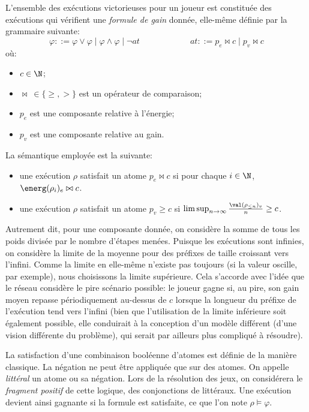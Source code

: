 L'ensemble des exécutions victorieuses pour un joueur est constituée des exécutions qui vérifient une \emph{formule de gain} donnée, elle-même définie par la grammaire suivante:
\[ \varphi ::= \varphi \vee \varphi \mid \varphi \wedge \varphi \mid \neg\mathit{at}
\hspace{6em}
\mathit{at} ::= p_e \bowtie c \mid p_v \bowtie c \]
où:
\begin{itemize}
    \item $c \in \N$;
    \item $\bowtie\ \in \{\geq,>\}$ est un opérateur de comparaison;
    \item $p_e$ est une composante relative à l'énergie;
    \item $p_v$ est une composante relative au gain.
\end{itemize}

La sémantique employée est la suivante:
\begin{itemize}
    \item une exécution $\rho$ satisfait un atome $p_e \bowtie c$ si pour chaque $i \in \N$, $\energ(\rho_i)_e \bowtie c$.
    \item une exécution $\rho$ satisfait un atome $p_v \geq c$ si $\limsup_{n \rightarrow \infty} \frac{\val(\rho_{\leq n})_v}{n} \geq c$.
\end{itemize}
Autrement dit, pour une composante donnée, on considère la somme de tous les poids divisée par le nombre d'étapes menées.
Puisque les exécutions sont infinies, on considère la limite de la moyenne pour des préfixes de taille croissant vers l'infini.
Comme la limite en elle-même n'existe pas toujours (si la valeur oscille, par exemple), nous choisissons la limite supérieure.
Cela s'accorde avec l'idée que le réseau considère le pire scénario possible: le joueur gagne si, au pire, son gain moyen repasse périodiquement au-dessus de $c$ lorsque la longueur du préfixe de l'exécution tend vers l'infini (bien que l'utilisation de la limite inférieure soit également possible, elle conduirait à la conception d'un modèle différent (d'une vision différente du problème), qui serait par ailleurs plus compliqué à résoudre).

La satisfaction d'une combinaison booléenne d'atomes est définie de la manière classique.
La négation ne peut être appliquée que sur des atomes.
On appelle \emph{littéral} un atome ou sa négation.
Lors de la résolution des jeux, on considérera le \emph{fragment positif} de cette logique, \cad des conjonctions de littéraux.
Une exécution devient ainsi gagnante si la formule est satisfaite, ce que l'on note $\rho\vDash\varphi$.

